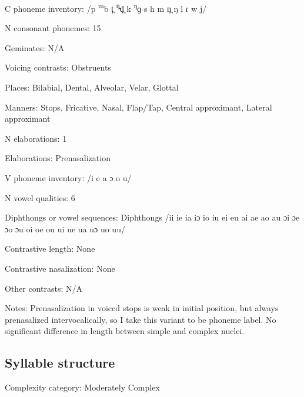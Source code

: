 {\begin{appendixdesc}
\item[C phoneme inventory:] /p \textsuperscript{m}b t̪ \textsuperscript{n̪}d̪ k \textsuperscript{ŋ}ɡ s h m n̪ ŋ l ɾ w j/

\item[N consonant phonemes:] 15

\item[Geminates:] N/A

\item[Voicing contrasts:] Obstruents

\item[Places:] Bilabial, Dental, Alveolar, Velar, Glottal

\item[Manners:] Stops, Fricative, Nasal, Flap/Tap, Central approximant, Lateral approximant

\item[N elaborations:] 1

\item[Elaborations:] Prenasalization

\item[V phoneme inventory:] /i e a ɔ o u/

\item[N vowel qualities:] 6

\item[Diphthongs or vowel sequences:] Diphthongs /ii ie ia iɔ io iu ei eu ai ae ao au ɔi ɔe ɔo ɔu oi oe ou ui ue ua uɔ uo uu/

\item[Contrastive length:] None

\item[Contrastive nasalization:] None

\item[Other contrasts:] N/A

\item[Notes:] Prenasalization in voiced stops is weak in initial position, but always prenasalized intervocalically, so I take this variant to be phoneme label. No significant difference in length between simple and complex nuclei.
\end{appendixdesc}
\subsection*{Syllable structure}
\begin{appendixdesc}

\item[Complexity category:] Moderately Complex


\end{appendixdesc}}
